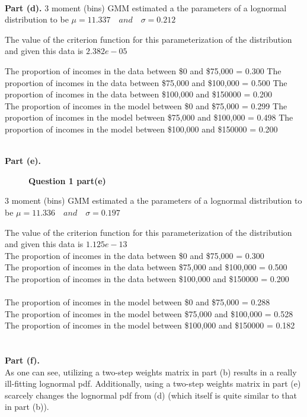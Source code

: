 \documentclass[letterpaper,12pt]{article}
\theoremstyle{definition}
\begin{document}
\\
\noindent\textbf{Part (d).}
3 moment (bins) GMM estimated a the parameters of a lognormal distribution to be $\mu=11.337\quad and \quad \sigma=0.212$

The value of the criterion function for this parameterization of the distribution and given this data is $2.382e-05$

The proportion of incomes in the data between \$0 and \$75,000 = 0.300
The proportion of incomes in the data between \$75,000 and \$100,000 = 0.500
The proportion of incomes in the data between \$100,000 and \$150000 = 0.200
\\
The proportion of incomes in the model between \$0 and \$75,000 = 0.299
The proportion of incomes in the model between \$75,000 and \$100,000 = 0.498
The proportion of incomes in the model between \$100,000 and \$150000 = 0.200


\\
\noindent\textbf{Part (e).}
\begin{figure}[H]\centering\captionsetup{width=4.0in}
  \caption{\textbf{Question 1 part(e)}}\label{Figure 1e}
\end{figure}
3 moment (bins) GMM estimated a the parameters of a lognormal distribution to be $\mu=11.336\quad and \quad \sigma=0.197$

The value of the criterion function for this parameterization of the distribution and given this data is $1.125e-13$\\

The proportion of incomes in the data between \$0 and \$75,000 = 0.300\\
The proportion of incomes in the data between \$75,000 and \$100,000 = 0.500\\
The proportion of incomes in the data between \$100,000 and \$150000 = 0.200\\
\\
The proportion of incomes in the model between \$0 and \$75,000 = 0.288\\
The proportion of incomes in the model between \$75,000 and \$100,000 = 0.528\\
The proportion of incomes in the model between \$100,000 and \$150000 = 0.182\\

\\
\\
\noindent\textbf{Part (f).}\\
As one can see, utilizing a two-step weights matrix in part (b) results in a really ill-fitting lognormal pdf. Additionally, using a two-step weights matrix
in part (e) scarcely changes the lognormal pdf from (d) (which itself is quite similar to that in part (b)). \\
\end{document}
